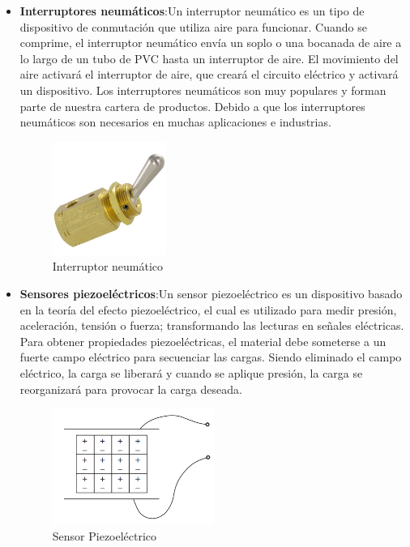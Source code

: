 \documentclass{article}
\begin{document}
\begin{itemize}
		\item \textbf{Interruptores neumáticos}:Un interruptor neumático es un tipo de dispositivo de conmutación que utiliza aire para funcionar. Cuando se comprime, el interruptor neumático envía un soplo o una bocanada de aire a lo largo de un tubo de PVC hasta un interruptor de aire. El movimiento del aire activará el interruptor de aire, que creará el circuito eléctrico y activará un dispositivo. Los interruptores neumáticos son muy populares y forman parte de nuestra cartera de productos. Debido a que los interruptores neumáticos son necesarios en muchas aplicaciones e industrias.
		\begin{figure}[H]
			\centering
			\includegraphics[width=0.35\textwidth]{interruptorneumatico.jpg}
			\caption{Interruptor neumático}
		\end{figure}
		
		
		\item \textbf{Sensores piezoeléctricos}:Un sensor piezoeléctrico es un dispositivo basado en la teoría del efecto piezoeléctrico, el cual es utilizado para medir presión, aceleración, tensión o fuerza; transformando las lecturas en señales eléctricas. Para obtener propiedades piezoeléctricas, el material debe someterse a un fuerte campo eléctrico para secuenciar las cargas. Siendo eliminado el campo eléctrico, la carga se liberará y cuando se aplique presión, la carga se reorganizará para provocar la carga deseada. 
			\begin{figure}[H]
			\centering
			\includegraphics[width=0.5\textwidth]{sensorpiezoelectrico.png}
			\caption{Sensor Piezoeléctrico}
		\end{figure}
		

\end{itemize}
\end{document}
